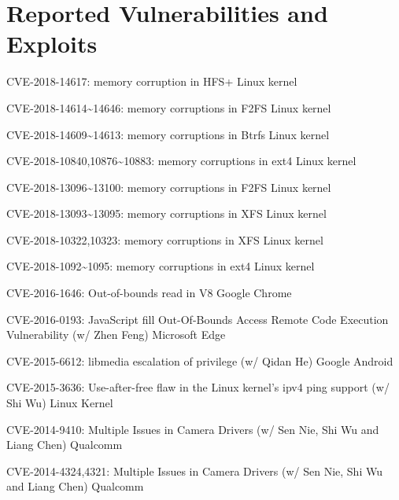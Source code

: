 \section*{Reported Vulnerabilities and Exploits}
\begin{description}
	\item CVE-2018-14617: memory corruption in HFS+ \dotfill Linux kernel
	\item CVE-2018-14614\textasciitilde14646: memory corruptions in F2FS \dotfill Linux kernel
	\item CVE-2018-14609\textasciitilde14613: memory corruptions in Btrfs \dotfill Linux kernel
	\item CVE-2018-10840,10876\textasciitilde10883: memory corruptions in ext4 \dotfill Linux kernel
	\item CVE-2018-13096\textasciitilde13100: memory corruptions in F2FS \dotfill Linux kernel
	\item CVE-2018-13093\textasciitilde13095: memory corruptions in XFS \dotfill Linux kernel
	\item CVE-2018-10322,10323: memory corruptions in XFS \dotfill Linux kernel
	\item CVE-2018-1092\textasciitilde1095: memory corruptions in ext4 \dotfill Linux kernel
	\item CVE-2016-1646: Out-of-bounds read in V8 \dotfill Google Chrome
	\item CVE-2016-0193: JavaScript fill Out-Of-Bounds Access Remote Code Execution Vulnerability (w/ Zhen Feng) \dotfill Microsoft Edge
	\item CVE-2015-6612: libmedia escalation of privilege (w/ Qidan He) \dotfill Google Android
	\item CVE-2015-3636: Use-after-free flaw in the Linux kernel’s ipv4 ping support (w/ Shi Wu) \dotfill Linux Kernel
	\item CVE-2014-9410: Multiple Issues in Camera Drivers (w/ Sen Nie, Shi Wu and Liang Chen) \dotfill Qualcomm
	\item CVE-2014-4324,4321: Multiple Issues in Camera Drivers (w/ Sen Nie, Shi Wu and Liang Chen) \dotfill Qualcomm
\end{description}

